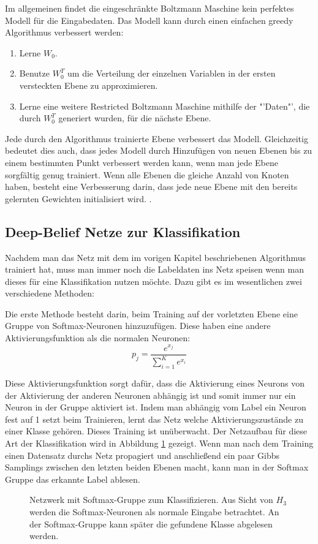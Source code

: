 \documentclass[12pt]{article}
\begin{document}
Im allgemeinen findet die eingeschränkte Boltzmann Maschine kein perfektes Modell für die Eingabedaten. Das Modell kann durch einen einfachen greedy Algorithmus verbessert werden:
 
\begin{enumerate}
\item Lerne $W_0$.
\item Benutze $W_0^T$ um die Verteilung der einzelnen Variablen in der ersten versteckten Ebene zu approximieren.
\item Lerne eine weitere Restricted Boltzmann Maschine  mithilfe der "'Daten"', die durch $W_0^T$ generiert wurden, für die nächste Ebene.
\end{enumerate}



Jede durch den Algorithmus trainierte Ebene verbessert das Modell. Gleichzeitig bedeutet dies auch, dass jedes Modell durch Hinzufügen von neuen Ebenen bis zu einem bestimmten Punkt verbessert werden kann, wenn man jede Ebene sorgfältig genug trainiert. Wenn alle Ebenen die gleiche Anzahl von Knoten haben, besteht eine Verbesserung darin, dass jede neue Ebene mit den bereits gelernten Gewichten initialisiert wird. \cite{learning}.

\subsection{Deep-Belief Netze zur Klassifikation}
Nachdem man das Netz mit dem im vorigen Kapitel beschriebenen Algorithmus trainiert hat, muss man immer noch die Labeldaten ins Netz speisen wenn man dieses für eine Klassifikation nutzen möchte. Dazu gibt es im wesentlichen zwei verschiedene Methoden:

Die erste Methode besteht darin, beim Training auf der vorletzten Ebene eine Gruppe von Softmax-Neuronen hinzuzufügen. Diese haben eine andere Aktivierungsfunktion als die normalen Neuronen: 
\begin{equation}
p_j = \frac{e^{x_j}}{\sum_{i=1}^K e^{x_i}}
\end{equation}

Diese Aktivierungsfunktion sorgt dafür, dass die Aktivierung eines Neurons von der Aktivierung der anderen Neuronen abhängig ist und somit immer nur ein Neuron in der Gruppe aktiviert ist. Indem man abhängig vom Label ein Neuron fest auf 1 setzt beim Trainieren, lernt das Netz welche Aktivierungszustände zu einer Klasse gehören. Dieses Training ist unüberwacht. Der Netzaufbau für diese Art der Klassifikation wird in Abbildung \ref{SMTrain} gezeigt. Wenn man nach dem Training einen Datensatz durchs Netz propagiert und anschließend ein paar Gibbs Samplings zwischen den letzten beiden Ebenen macht, kann man in der Softmax Gruppe das erkannte Label ablesen.
\begin{figure}[H]
	\center
	
	\caption{Netzwerk mit Softmax-Gruppe zum Klassifizieren. Aus Sicht von $H_3$ werden die Softmax-Neuronen als normale Eingabe betrachtet. An der Softmax-Gruppe kann später die gefundene Klasse abgelesen werden.}
	\label{SMTrain}
\end{figure}
\end{document}
